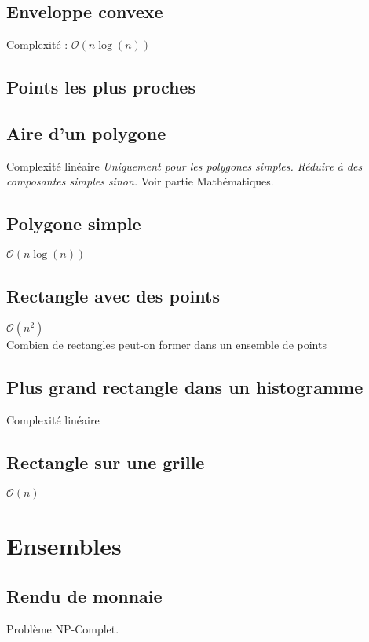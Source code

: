 \documentclass[8pt]{article}
\begin{document}
        \subsection{Enveloppe convexe}
            Complexité : $\mathcal{O}(n \log(n))$
            {\scriptsize}
        \subsection{Points les plus proches}
            {\scriptsize}
        \subsection{Aire d'un polygone}
        Complexité linéaire
        \textit{Uniquement pour les polygones simples. Réduire à des composantes simples sinon.}
        Voir partie Mathématiques.
        {\scriptsize}
        \subsection{Polygone simple}
        $\mathcal{O}(n\log(n))$
        {\scriptsize}
        \subsection{Rectangle avec des points}
        $\mathcal{O}(n^2)$\\
        Combien de rectangles peut-on former dans un ensemble de points
        {\scriptsize}
        \subsection{Plus grand rectangle dans un histogramme}
        Complexité linéaire
        {\scriptsize}
        \subsection{Rectangle sur une grille}
        $\mathcal{O}(n)$
        {\scriptsize}
    \section{Ensembles}
        \subsection{Rendu de monnaie}
        Problème NP-Complet.
        {\scriptsize}
\end{document}
